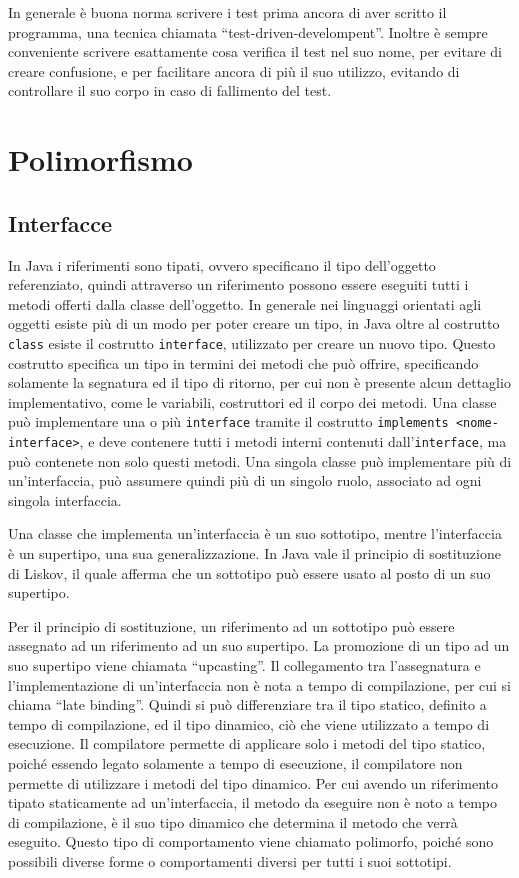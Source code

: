 \documentclass{article}
\numberwithin{equation}{subsection}
\begin{document}
In generale è buona norma scrivere i test prima ancora di aver scritto il programma, una tecnica chiamata ``test-driven-develompent''. 
Inoltre è sempre conveniente scrivere esattamente cosa verifica il test nel suo nome, per evitare di creare confusione, e per facilitare ancora di più il suo utilizzo, evitando di controllare 
il suo corpo in caso di fallimento del test. 

\clearpage

\section{Polimorfismo}

\subsection{Interfacce}

In Java i riferimenti sono tipati, ovvero specificano il tipo dell'oggetto referenziato, quindi attraverso un riferimento possono essere eseguiti tutti i metodi offerti dalla 
classe dell'oggetto. In generale nei linguaggi orientati agli oggetti esiste più di un modo per poter creare un tipo, in Java oltre al costrutto \verb|class| esiste il 
costrutto \verb|interface|, utilizzato per creare un nuovo tipo. 
Questo costrutto specifica un tipo in termini dei metodi che può offrire, specificando solamente la segnatura ed il tipo di ritorno, per cui non è presente alcun dettaglio 
implementativo, come le variabili, costruttori ed il corpo dei metodi. Una classe può implementare una o più \verb|interface| tramite il costrutto \verb|implements <nome-interface>|, 
e deve contenere tutti i metodi interni contenuti dall'\verb|interface|, ma può contenete non solo questi metodi. 
Una singola classe può implementare più di un'interfaccia, può assumere quindi più di un singolo ruolo, associato ad ogni singola interfaccia. 


Una classe che implementa un'interfaccia è un suo sottotipo, mentre l'interfaccia è un supertipo, una sua generalizzazione. 
In Java vale il principio di sostituzione di Liskov, il quale afferma che un sottotipo può essere usato al posto di un suo supertipo. 


Per il principio di sostituzione, un riferimento ad un sottotipo può essere assegnato ad un riferimento ad un suo supertipo. La promozione di un tipo ad un suo supertipo viene 
chiamata ``upcasting''. 
Il collegamento tra l'assegnatura e l'implementazione di un'interfaccia non è nota a tempo di compilazione, per cui si chiama ``late binding''. 
Quindi si può differenziare tra il tipo statico, definito a tempo di compilazione, ed il tipo dinamico, ciò che viene utilizzato a tempo di esecuzione. Il compilatore 
permette di applicare solo i metodi del tipo statico, poiché essendo legato solamente a tempo di esecuzione, il compilatore non permette di utilizzare i metodi del tipo 
dinamico. 
Per cui avendo un riferimento tipato staticamente ad un'interfaccia, il metodo da eseguire non è noto a tempo di compilazione, è il suo tipo dinamico che determina il metodo che verrà 
eseguito. Questo tipo di comportamento viene chiamato polimorfo, poiché sono possibili diverse forme o comportamenti diversi per tutti i suoi sottotipi. 
\end{document}
